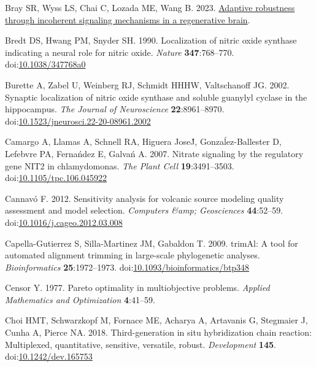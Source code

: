 \documentclass[
  11pt,
  letterpaper,
  DIV=11,
  numbers=noendperiod]{scrartcl}
\newlength{\cslhangindent}
\newenvironment{CSLReferences}[2] %
 {\begin{list}{}{%
  \setlength{\itemindent}{0pt}
  \setlength{\leftmargin}{0pt}
  \setlength{\parsep}{0pt}
  \ifodd #1
   \setlength{\leftmargin}{\cslhangindent}
   \setlength{\itemindent}{-1\cslhangindent}
  \fi
  \setlength{\itemsep}{#2\baselineskip}}}
 {\end{list}}
\begin{document}
\begin{CSLReferences}{1}{0}
Bray SR, Wyss LS, Chai C, Lozada ME, Wang B. 2023.
\href{http://dx.doi.org/10.1101/2023.01.20.523817}{Adaptive robustness
through incoherent signaling mechanisms in a regenerative brain}.

Bredt DS, Hwang PM, Snyder SH. 1990. Localization of nitric oxide
synthase indicating a neural role for nitric oxide. \emph{Nature}
\textbf{347}:768--770.
doi:\href{https://doi.org/10.1038/347768a0}{10.1038/347768a0}

Burette A, Zabel U, Weinberg RJ, Schmidt HHHW, Valtschanoff JG. 2002.
Synaptic localization of nitric oxide synthase and soluble guanylyl
cyclase in the hippocampus. \emph{The Journal of Neuroscience}
\textbf{22}:8961--8970.
doi:\href{https://doi.org/10.1523/jneurosci.22-20-08961.2002}{10.1523/jneurosci.22-20-08961.2002}

Camargo A, Llamas A, Schnell RA, Higuera JoseJ́, Gonzaĺez-Ballester D,
Lefebvre PA, Fernańdez E, Galvań A. 2007. Nitrate signaling by the
regulatory gene NIT2 in chlamydomonas. \emph{The Plant Cell}
\textbf{19}:3491--3503.
doi:\href{https://doi.org/10.1105/tpc.106.045922}{10.1105/tpc.106.045922}

Cannavó F. 2012. Sensitivity analysis for volcanic source modeling
quality assessment and model selection. \emph{Computers \&amp;
Geosciences} \textbf{44}:52--59.
doi:\href{https://doi.org/10.1016/j.cageo.2012.03.008}{10.1016/j.cageo.2012.03.008}

Capella-Gutierrez S, Silla-Martinez JM, Gabaldon T. 2009. trimAl: A tool
for automated alignment trimming in large-scale phylogenetic analyses.
\emph{Bioinformatics} \textbf{25}:1972--1973.
doi:\href{https://doi.org/10.1093/bioinformatics/btp348}{10.1093/bioinformatics/btp348}

Censor Y. 1977. Pareto optimality in multiobjective problems.
\emph{Applied Mathematics and Optimization} \textbf{4}:41--59.

Choi HMT, Schwarzkopf M, Fornace ME, Acharya A, Artavanis G, Stegmaier
J, Cunha A, Pierce NA. 2018. Third-generation in situ hybridization
chain reaction: Multiplexed, quantitative, sensitive, versatile, robust.
\emph{Development} \textbf{145}.
doi:\href{https://doi.org/10.1242/dev.165753}{10.1242/dev.165753}


\end{CSLReferences}
\end{document}
